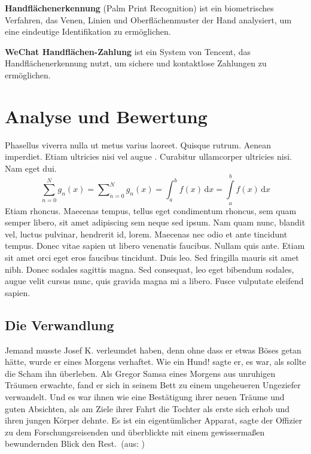 \documentclass[paper=a4,fontsize=12pt,ngerman]{scrartcl}
\begin{document}
\textbf{Handflächenerkennung} (Palm Print Recognition) ist ein biometrisches Verfahren, 
das Venen, Linien und Oberflächenmuster der Hand analysiert, um eine eindeutige 
Identifikation zu ermöglichen.

\textbf{WeChat Handflächen-Zahlung} ist ein System von Tencent, das Handflächenerkennung 
nutzt, um sichere und kontaktlose Zahlungen zu ermöglichen.

\section{Analyse und Bewertung}
Phasellus viverra nulla ut metus varius laoreet. Quisque rutrum. Aenean 
imperdiet. Etiam ultricies nisi vel augue \cite{ab94}. Curabitur ullamcorper 
ultricies nisi. Nam eget dui. 
\begin{equation}
  \sum_{n=0}^N g_n(x) = \sum\nolimits_{n=0}^N g_n(x) =
  \int_a^b f(x) \,\mbox{d}x = \int\limits_a^b f(x) \,\mbox{d}x 
\end{equation}
Etiam rhoncus. Maecenas tempus, tellus eget condimentum rhoncus, sem quam 
semper libero, sit amet adipiscing sem neque sed ipsum. Nam quam nunc, 
blandit vel, luctus pulvinar, hendrerit id, lorem. Maecenas nec odio et ante 
\cite{ah2006} tincidunt tempus. Donec vitae sapien ut libero venenatis 
faucibus. Nullam quis ante. Etiam sit amet orci eget eros faucibus tincidunt. 
Duis leo. Sed fringilla mauris sit amet nibh. Donec sodales sagittis magna. 
Sed consequat, leo eget bibendum sodales, augue velit cursus nunc, quis 
gravida magna mi a libero. Fusce vulputate eleifend sapien.

\subsection{Die Verwandlung}
\glqq Jemand musste Josef K. verleumdet haben, denn ohne dass er etwas Böses 
getan hätte, wurde er eines Morgens verhaftet. Wie ein Hund! sagte er, es 
war, als sollte die Scham ihn überleben. Als Gregor Samsa eines Morgens aus 
unruhigen Träumen erwachte, fand er sich in seinem Bett zu einem ungeheueren 
Ungeziefer verwandelt. Und es war ihnen wie eine Bestätigung ihrer neuen 
Träume und guten Absichten, als am Ziele ihrer Fahrt die Tochter als erste 
sich erhob und ihren jungen Körper dehnte. Es ist ein eigentümlicher Apparat, 
sagte der Offizier zu dem Forschungsreisenden und überblickte mit einem 
gewissermaßen bewundernden Blick den Rest.\grqq \ (aus: \cite{kaf12})
\end{document}
